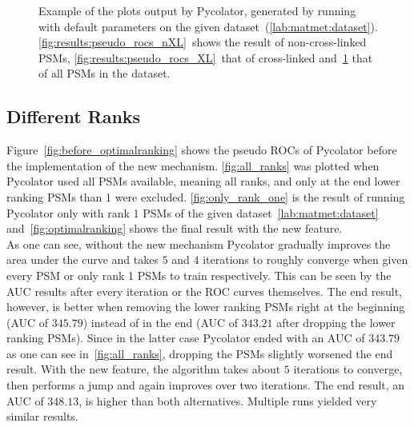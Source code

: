 \begin{figure}
\begin{subfigure}{0.49\textwidth}
		\caption{}
		\label{fig:results:pseudo_rocs_all}
	\end{subfigure}
	\caption[Examples for pseudo ROC curves as produced by Pycolator]{Example of the plots output by Pycolator, generated by running with default parameters on the given dataset~(\ref{lab:matmet:dataset}). \ref{fig:results:pseudo_rocs_nXL}~shows the result of non-cross-linked PSMs, \ref{fig:results:pseudo_rocs_XL}~that of cross-linked and~\ref{fig:results:pseudo_rocs_all} that of all PSMs in the dataset.}
	\label{fig:results:pseudo_rocs}
\end{figure}
\renewcommand{\baselinestretch}{1}

\subsection{Different Ranks}
\label{lab:results:ranks}
Figure~\ref{fig:before_optimalranking} shows the pseudo ROCs of Pycolator before the implementation of the new mechanism. \ref{fig:all_ranks} was plotted when Pycolator used all PSMs available, meaning all ranks, and only at the end lower ranking PSMs than 1 were excluded. \ref{fig:only_rank_one} is the result of running Pycolator only with rank 1 PSMs of the given dataset~\ref{lab:matmet:dataset} and~\ref{fig:optimalranking} shows the final result with the new feature.\\
As one can see, without the new mechanism Pycolator gradually improves the area under the curve and takes $5$ and $4$ iterations to roughly converge when given every PSM or only rank 1 PSMs to train respectively. This can be seen by the AUC results after every iteration or the ROC curves themselves. The end result, however, is better when removing the lower ranking PSMs right at the beginning (AUC of $345.79$) instead of in the end (AUC of $343.21$ after dropping the lower ranking PSMs). Since in the latter case Pycolator ended with an AUC of $343.79$ as one can see in~\ref{fig:all_ranks}, dropping the PSMs slightly worsened the end result. With the new feature, the algorithm takes about $5$ iterations to converge, then performs a jump and again improves over two iterations. The end result, an AUC of $348.13$, is higher than both alternatives. Multiple runs yielded very similar results. 
\renewcommand{\baselinestretch}{0.9}
